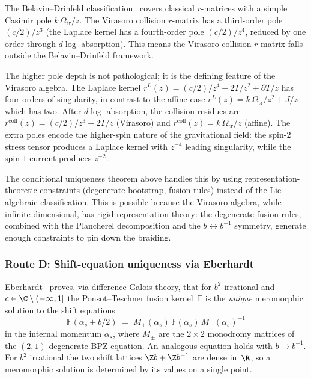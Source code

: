 \begin{remark}
\label{rem:BD-gap}
The Belavin--Drinfeld classification~\cite{BelavinDrinfeld} covers
classical $r$-matrices with a simple Casimir pole
$k\,\Omega_{\mathrm{tr}}/z$. The Virasoro collision $r$-matrix has a
third-order pole $(c/2)/z^3$
(the Laplace kernel has a fourth-order pole $(c/2)/z^4$, reduced
by one order through $d\log$ absorption).
This means the Virasoro collision $r$-matrix falls outside the
Belavin--Drinfeld framework.

The higher pole depth is not pathological; it is the defining
feature of the Virasoro algebra. The Laplace kernel
$r^L(z) = (c/2)/z^4 + 2T/z^2 + \partial T/z$ has four
orders of singularity, in contrast to the affine case
$r^L(z) = k\,\Omega_{\mathrm{tr}}/z^2 + J/z$ which has two.
After $d\log$ absorption, the collision residues are
$r^{\mathrm{coll}}(z) = (c/2)/z^3 + 2T/z$ (Virasoro) and
$r^{\mathrm{coll}}(z) = k\,\Omega_{\mathrm{tr}}/z$ (affine).
The extra poles encode the higher-spin nature of the gravitational
field: the spin-$2$ stress tensor produces a Laplace kernel with
$z^{-4}$ leading singularity, while the spin-$1$ current produces
$z^{-2}$.

The conditional uniqueness theorem above handles this by using
representation-theoretic constraints (degenerate bootstrap, fusion
rules) instead of the Lie-algebraic classification. This is
possible because the Virasoro algebra, while infinite-dimensional,
has rigid representation theory: the degenerate
fusion rules, combined with the Plancherel decomposition and
the $b \leftrightarrow b^{-1}$ symmetry, generate enough
constraints to pin down the braiding.
\end{remark}

\subsubsection{Route D: Shift-equation uniqueness via Eberhardt}
\label{subsubsec:route-D-eberhardt}

Eberhardt~\cite{Eberhardt23} proves, via difference Galois theory,
that for $b^2$ irrational and $c \in \C \setminus (-\infty, 1]$
the Ponsot--Teschner fusion kernel~$\mathbb{F}$ is the
\emph{unique} meromorphic solution to the shift equations
\begin{equation}\label{eq:shift-equations}
\mathbb{F}(\alpha_s + b/2) \;=\;
M_+(\alpha_s)\,\mathbb{F}(\alpha_s)\,M_-(\alpha_s)^{-1}
\end{equation}
in the internal momentum $\alpha_s$, where $M_\pm$ are the
$2 \times 2$ monodromy matrices of the $(2,1)$-degenerate
BPZ equation. An analogous equation holds with $b \to b^{-1}$.
For $b^2$ irrational the two shift lattices $\Z b + \Z b^{-1}$
are dense in~$\R$, so a meromorphic solution is determined by
its values on a single point.

